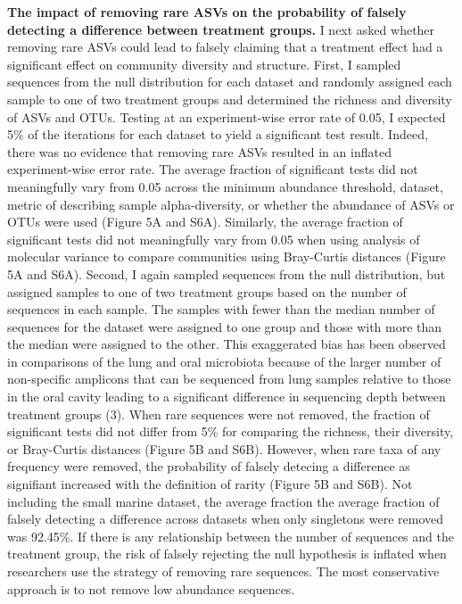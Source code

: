 \documentclass[
]{article}
\begin{document}
\textbf{The impact of removing rare ASVs on the probability of falsely
detecting a difference between treatment groups.} I next asked whether
removing rare ASVs could lead to falsely claiming that a treatment
effect had a significant effect on community diversity and structure.
First, I sampled sequences from the null distribution for each dataset
and randomly assigned each sample to one of two treatment groups and
determined the richness and diversity of ASVs and OTUs. Testing at an
experiment-wise error rate of 0.05, I expected 5\% of the iterations for
each dataset to yield a significant test result. Indeed, there was no
evidence that removing rare ASVs resulted in an inflated experiment-wise
error rate. The average fraction of significant tests did not
meaningfully vary from 0.05 across the minimum abundance threshold,
dataset, metric of describing sample alpha-diversity, or whether the
abundance of ASVs or OTUs were used (Figure 5A and S6A). Similarly, the
average fraction of significant tests did not meaningfully vary from
0.05 when using analysis of molecular variance to compare communities
using Bray-Curtis distances (Figure 5A and S6A). Second, I again sampled
sequences from the null distribution, but assigned samples to one of two
treatment groups based on the number of sequences in each sample. The
samples with fewer than the median number of sequences for the dataset
were assigned to one group and those with more than the median were
assigned to the other. This exaggerated bias has been observed in
comparisons of the lung and oral microbiota because of the larger number
of non-specific amplicons that can be sequenced from lung samples
relative to those in the oral cavity leading to a significant difference
in sequencing depth between treatment groups (3). When rare sequences
were not removed, the fraction of significant tests did not differ from
5\% for comparing the richness, their diversity, or Bray-Curtis
distances (Figure 5B and S6B). However, when rare taxa of any frequency
were removed, the probability of falsely detecing a difference as
signifiant increased with the definition of rarity (Figure 5B and S6B).
Not including the small marine dataset, the average fraction the average
fraction of falsely detecting a difference across datasets when only
singletons were removed was 92.45\%. If there is any relationship
between the number of sequences and the treatment group, the risk of
falsely rejecting the null hypothesis is inflated when researchers use
the strategy of removing rare sequences. The most conservative approach
is to not remove low abundance sequences.
\end{document}
